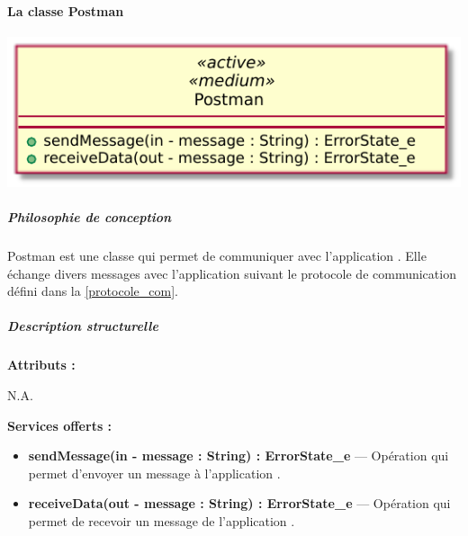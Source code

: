 \paragraph{La classe Postman}

\begin{minipage}
    {\linewidth}
    \centering
    \includegraphics[width=0.50\linewidth]{../schemas/Conception_detaillee/classe_postman.pdf}
\end{minipage}

\subparagraph{Philosophie de conception \newline} 

\medspace

Postman est une classe qui permet de communiquer avec l'application {\nomApplication}. Elle échange divers messages avec l'application suivant le protocole de communication défini dans la \autoref{protocole_com}.

\subparagraph{Description structurelle \newline}

\medspace

\textbf{Attributs :}

N.A.

\textbf{Services offerts :}

\begin{itemize}
    \item \textbf{sendMessage(in - message : String) : ErrorState\_e} --- Opération qui permet d'envoyer un message à l'application {\nomApplication}.
    \item \textbf{receiveData(out - message : String) : ErrorState\_e} --- Opération qui permet de recevoir un message de l'application {\nomApplication}.
\end{itemize}
